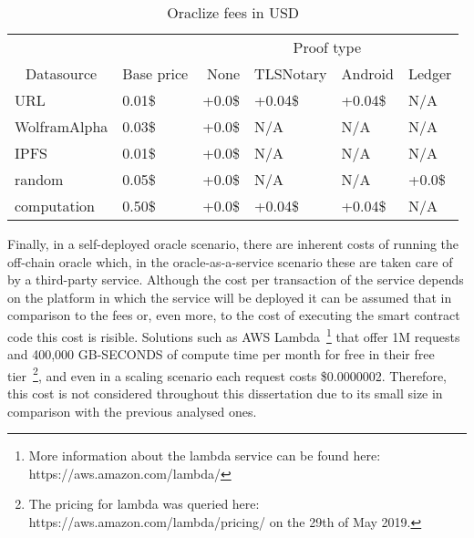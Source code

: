 \begin{table}
    \centering
    \begin{tabular}{@{}llllll@{}}
        \cmidrule(l){3-6}
                                       & \multicolumn{1}{l|}{}          & \multicolumn{4}{c|}{Proof type}                                                                                            \\ \cmidrule(r){1-2}
        \multicolumn{1}{c}{Datasource} & \multicolumn{1}{c}{Base price} & \multicolumn{1}{r}{None}        & \multicolumn{1}{r}{TLSNotary} & \multicolumn{1}{r}{Android} & \multicolumn{1}{r}{Ledger} \\ \midrule
        URL                            & 0.01\$                         & +0.0\$                          & +0.04\$                       & +0.04\$                     & N/A                        \\
        WolframAlpha                   & 0.03\$                         & +0.0\$                          & N/A                           & N/A                         & N/A                        \\
        IPFS                           & 0.01\$                         & +0.0\$                          & N/A                           & N/A                         & N/A                        \\
        random                         & 0.05\$                         & +0.0\$                          & N/A                           & N/A                         & +0.0\$                     \\
        computation                    & 0.50\$                         & +0.0\$                          & +0.04\$                       & +0.04\$                     & N/A                        \\ \bottomrule
    \end{tabular}
    \caption{Oraclize fees in USD}
    \label{tab:oraclize-fees}
\end{table}

Finally, in a self-deployed oracle scenario, there are inherent costs of running the off-chain oracle which, in the oracle-as-a-service scenario these are taken care of by a third-party service. Although the cost per transaction of the service depends on the platform in which the service will be deployed it can be assumed that in comparison to the fees or, even more, to the cost of executing the smart contract code this cost is risible. Solutions such as AWS Lambda~\footnote{More information about the lambda service can be found here: https://aws.amazon.com/lambda/} that offer 1M requests and 400,000 GB-SECONDS of compute time per month for free in their free tier~\footnote{The pricing for lambda was queried here: https://aws.amazon.com/lambda/pricing/ on the 29th of May 2019.}, and even in a scaling scenario each request costs \$0.0000002. Therefore, this cost is not considered throughout this dissertation due to its small size in comparison with the previous analysed ones.

